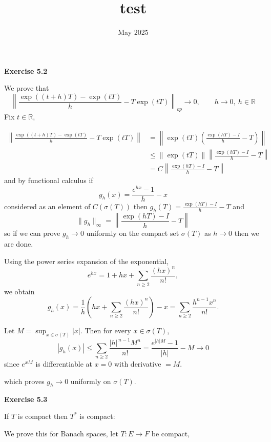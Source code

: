\documentclass{article}
\title{test}
\date{May 2025}
\begin{document}
\vspace{0.5cm}

\textbf{Exercise 5.2}

\vspace{0.5cm}

\noindent We prove that 
$$ \left\| \frac{\exp((t+h)T) - \exp(tT)}{h} -T\exp(tT)\right\|_{op} \rightarrow 0, \qquad h \rightarrow 0, \ h \in \mathbb R$$
Fix $t \in \mathbb R$,

\begin{align*}
\left\| \frac{\exp((t+h)T) - \exp(tT)}{h} -T\exp(tT)\right\| & = \left\| \exp(tT) ( \frac{\exp(hT) - I}{h} - T)\right\| \\
& \leq \| \exp(tT) \| \left\| \frac{\exp(hT) - I}{h} - T \right\| \\
& = C\left\| \frac{\exp(hT) - I}{h} - T\right\|
\end{align*}
and by functional calculus if 
$$g_h(x) = \frac{e^{hx} - 1}{h} - x$$ 
considered as an element of $C(\sigma(T))$ then $g_h(T) =\frac{\exp(hT) - I}{h} - T$ and 
$$\|g_h\|_\infty = \left\|\frac{\exp(hT) - I}{h} - T \right\|$$ 
so if we can prove $g_h \rightarrow 0$ uniformly on the compact set $\sigma(T)$ as $h \rightarrow 0$ then we are done. 

Using the power series expansion of the exponential,
\[
e^{hx} = 1 + hx + \sum_{n \ge 2} \frac{(hx)^n}{n!},
\]
we obtain
\[
g_h(x)
= \frac{1}{h} \left( hx + \sum_{n \ge 2} \frac{(hx)^n}{n!} \right) - x
= \sum_{n \ge 2} \frac{h^{n-1} x^n}{n!}.
\]

Let $M = \sup_{x \in \sigma(T)} |x|$. Then for every $x \in \sigma(T)$,
\[
|g_h(x)|
\le \sum_{n \ge 2} \frac{|h|^{\,n-1} M^n}{n!}
= \frac{ e^{|h|M} - 1 }{|h|} - M \rightarrow 0
\]
since $e^{xM}$ is differentiable at $x = 0$ with derivative $=M$.

which proves \(g_h\to0\) uniformly on \(\sigma(T)\).

\vspace{0.5cm}

\textbf{Exercise 5.3}

\vspace{0.5cm}

\noindent If $T$ is compact then $T^*$ is compact: 

\vspace{0.3cm}

We prove this for Banach spaces, let $T: E \rightarrow F$ be compact, 
\end{document}
